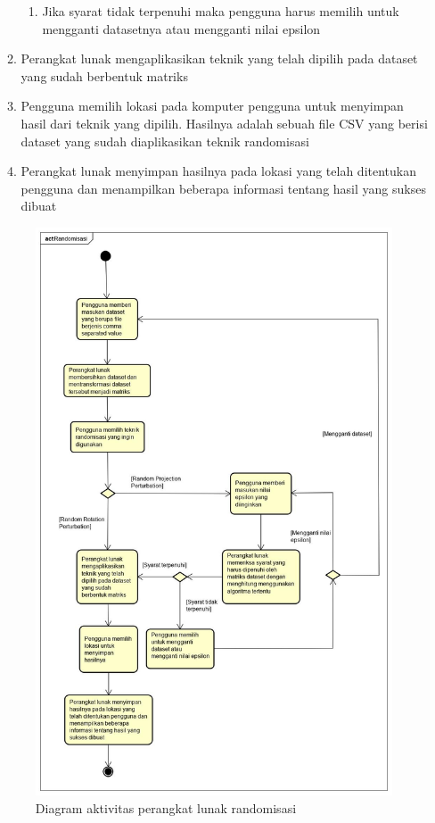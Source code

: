 \documentclass[a4paper,twoside]{article}
\begin{document}
\begin{enumerate}
\begin{enumerate}
\begin{enumerate}
				\item Jika syarat tidak terpenuhi maka pengguna harus memilih untuk mengganti datasetnya atau mengganti nilai epsilon
			\end{enumerate}
			\item Perangkat lunak mengaplikasikan teknik yang telah dipilih pada dataset yang sudah berbentuk matriks
			\item Pengguna memilih lokasi pada komputer pengguna untuk menyimpan hasil dari teknik yang dipilih. Hasilnya adalah sebuah file CSV yang berisi dataset yang sudah diaplikasikan teknik randomisasi
			\item Perangkat lunak menyimpan hasilnya pada lokasi yang telah ditentukan pengguna dan menampilkan beberapa informasi tentang hasil yang sukses dibuat
		\end{enumerate}

		\begin{figure}
			\centering
			\includegraphics[scale=0.4]{activitydiagram}
			\caption{Diagram aktivitas perangkat lunak randomisasi}
			\label{fig:activitydiagram}
		\end{figure}


\end{enumerate}
\end{document}

